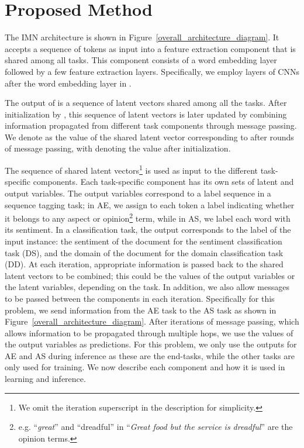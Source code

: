 \documentclass[11pt,a4paper]{article}
\begin{document}
\section{Proposed Method}
The IMN architecture is shown in Figure~\ref{overall_architecture_diagram}. It accepts a sequence of tokens  as input into a feature extraction component  that is shared among all tasks. This component consists of a word embedding layer followed by a few feature extraction layers. Specifically, we employ  layers of CNNs after the word embedding layer in .

The output of  is a sequence of latent vectors  shared among all the tasks. After initialization by , this sequence of latent vectors is later updated by combining information propagated from different task components through message passing. We denote  as the value of the shared latent vector corresponding to  after  rounds of message passing, with  denoting the value after initialization. 

The sequence of shared latent vectors\footnote{We omit the iteration superscript  in the description for simplicity.}  is used as input to the different task-specific components. Each task-specific component has its own sets of latent and output variables. The output variables correspond to a label sequence in a sequence tagging task; in AE, we assign to each token a label indicating whether it belongs to any aspect or opinion\footnote{e.g. ``\emph{great}'' and ``dreadful'' in ``\emph{Great food but the service is dreadful}'' are the opinion terms.} term, while in AS, we label each word with its sentiment. 
In a classification task, the output corresponds to the label of the input instance: the sentiment of the document for the sentiment classification task (DS), and the domain of the document for the domain classification task (DD). At each iteration, appropriate information is passed back to the shared latent vectors to be combined; this could be the values of the output variables or the latent variables, depending on the task. In addition, we also allow messages to be passed between the components in each iteration. Specifically for this problem, we send information from the AE task to the AS task as shown in Figure~\ref{overall_architecture_diagram}. After  iterations of message passing, which allows information to be propagated through multiple hops, we use the values of the output variables as predictions. For this problem, we only use the outputs for AE and AS during inference as these are the end-tasks, while the other tasks are only used for training.
We now describe each component and how it is used in learning and inference. 
\end{document}
